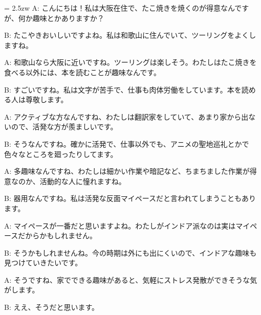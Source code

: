 \documentclass[11pt]{amsart}
\title{}
\author{}
\newenvironment{hangall}[1]{\hangindent = 2.5zw\everypar{\hangindent = 2.5zw}}{}
\begin{document}
\maketitle
\begin{hangall}{}%
A: こんにちは！私は大阪在住で、たこ焼きを焼くのが得意なんですが、何か趣味とかありますか？

B: たこやきおいしいですよね。私は和歌山に住んでいて、ツーリングをよくしますね。

A: 和歌山なら大阪に近いですね。ツーリングは楽しそう。わたしはたこ焼きを食べる以外には、本を読むことが趣味なんです。

B: すごいですね。私は文字が苦手で、仕事も肉体労働をしています。本を読める人は尊敬します。

A: アクティブな方なんですね、わたしは翻訳家をしていて、あまり家から出ないので、活発な方が羨ましいです。

B: そうなんですね。確かに活発で、仕事以外でも、アニメの聖地巡礼とかで色々なところを廻ったりしてます。

A: 多趣味なんですね、わたしは細かい作業や暗記など、ちまちました作業が得意なのか、活動的な人に憧れますね。

B: 器用なんですね。私は活発な反面マイペースだと言われてしまうこともあります。

A: マイペースが一番だと思いますよね。わたしがインドア派なのは実はマイペースだからかもしれません。

B: そうかもしれませんね。今の時期は外にも出にくいので、インドアな趣味も見つけていきたいです。

A: そうですね、家でできる趣味があると、気軽にストレス発散ができそうな気がします。

B: ええ、そうだと思います。
\end{hangall}
\end{document}
